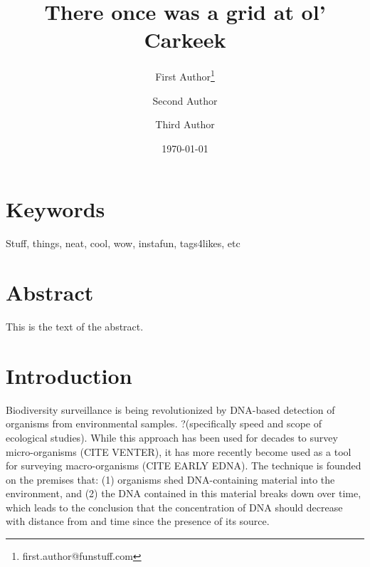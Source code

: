\documentclass[11pt,letterpaper]{article} %
\date{\today}
\title{There once was a grid at ol' Carkeek}
\author[1]{First Author\thanks{first.author@funstuff.com}}
\author[1,2]{Second Author}
\author[2]{Third Author}
\affil[1]{Department of Computer Science, \LaTeX\ University}
\affil[2]{Department of Mechanical Engineering, Superfabulous University}
\begin{document}
\maketitle
\linenumbers %
\def\linenumberfont{\normalfont\small\rmfamily} %


\section*{Keywords}
Stuff, things, neat, cool, wow, instafun, tags4likes, etc

\section*{Abstract}
This is the text of the abstract.

\section*{Introduction}

Biodiversity surveillance is being revolutionized by DNA-based detection of organisms from environmental samples. ?(specifically speed and scope of ecological studies). %
While this approach has been used for decades to survey micro-organisms (CITE VENTER), it has more recently become used as a tool for surveying macro-organisms (CITE EARLY EDNA).
The technique is founded on the premises that:
(1) organisms shed DNA-containing material into the environment, and
(2) the DNA contained in this material breaks down over time,
which leads to the conclusion that the concentration of DNA should decrease with distance from and time since the presence of its source.

\end{document}
